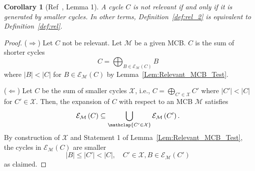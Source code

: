 \documentclass[fleqn,11pt]{article}
\newtheorem{corollary}[theorem]{Corollary}
\newcommand\calM{\mathcal{M}}
\newcommand\calX{\mathcal{X}}     %
\newcommand\expand[2]{\mathcal{E}_{#1}\left(#2\right)}   %
\newcommand\expandd[2]{\mathcal{E}_{#1}(#2)}             %
\begin{document}
\begin{corollary}[{Ref~\cite{vismaraUnion1997}, Lemma 1}]
	A cycle $C$ is not relevant if and only if it is generated by smaller cycles. In other terms, Definition~\ref{def:rel_2} is equivalent to Definition~\ref{def:rel}.
	\label{cor:rel_def_eq}
\end{corollary}
\begin{proof}
	($\Rightarrow$) Let $C$ not be relevant. Let $\calM$ be a given MCB. $C$ is the sum of shorter cycles
	\begin{equation}
		C = \bigoplus_{B\in\expand{\mathcal{M}}{C}} B
	\end{equation}
	where $|B|<|C|$ for $B\in\expandd{\calM}{C}$ by Lemma~\ref{Lem:Relevant_MCB_Test}.
	
	($\Leftarrow$) Let $C$ be the sum of smaller cycles $\calX$, i.e., $C=\bigoplus_{C'\in\calX}C'$ where $|C'|<|C|$ for $C'\in\calX$. Then, the expansion of $C$ with respect to an MCB $\calM$ satisfies
	\begin{equation}
		\expand{\calM}{C} \subseteq \bigcup_{\mathclap{C'\in\calX}} \expand{\calM}{C'}.
	\end{equation}
	By construction of $\calX$ and Statement 1 of Lemma~\ref{Lem:Relevant_MCB_Test}, the cycles in $\expand{\calM}{C}$ are smaller 
	\begin{equation}
		|B|\le |C'|<|C|,\quad C'\in\calX,B\in\expand{\calM}{C'}
	\end{equation}
	as claimed.
\end{proof}
\end{document}
